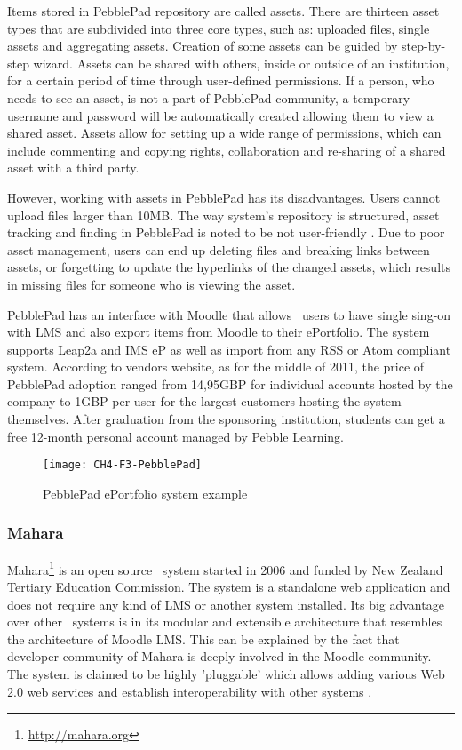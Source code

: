 Items stored in PebblePad repository are called assets. There are thirteen asset
types that are subdivided into three core types, such as: uploaded files, single
assets and aggregating assets. Creation of some assets can be guided by
step-by-step wizard. Assets can be shared with others, inside or outside of an
institution, for a certain period of time through user-defined permissions. If a
person, who needs to see an asset, is not a part of PebblePad community, a
temporary username and password will be automatically created allowing them to
view a shared asset. Assets allow for setting up a wide range of permissions,
which can include commenting and copying rights, collaboration and re-sharing
of a shared asset with a third party.

However, working with assets in PebblePad has its disadvantages. Users cannot
upload files larger than 10MB. The way system's repository is structured, asset
tracking and finding in PebblePad is noted to be not user-friendly
\citep{Overton2009}. Due to poor asset management, users can end up deleting
files and breaking links between assets, or forgetting to update the hyperlinks
of the changed assets, which results in missing files for someone who is viewing
the asset.

PebblePad has an interface with Moodle that allows \ep~users to have
single sing-on with LMS and also export items from Moodle to their ePortfolio.
The system supports Leap2a and IMS eP as well as import from any RSS or Atom
compliant system. According to vendors website, as for the middle of 2011,
the price of PebblePad adoption ranged from 14,95GBP for individual accounts
hosted by the company to 1GBP per user for the largest customers hosting
the system themselves. After graduation from the sponsoring institution,
students can get a free 12-month personal account managed by Pebble Learning.

\begin{figure}[htb]
\centering
\texttt{[image: CH4-F3-PebblePad]}
\caption[PebblePad ePortfolio system example]{PebblePad ePortfolio system example
\citep{PebbleLearningLtd}}
\label{fig:ppep}
\end{figure}
 
\subsubsection{Mahara}
Mahara\footnote{\url{http://mahara.org}} is an open source \ep~system started in
2006 and funded by New Zealand Tertiary Education Commission. The system is a
standalone web application and does not require any kind of LMS or another
system installed. Its big advantage over other \ep~systems is in its modular and
extensible architecture that resembles the architecture of Moodle LMS. This can
be explained by the fact that developer community of Mahara is deeply involved
in the Moodle community. The system is claimed to be highly 'pluggable' which
allows adding various Web 2.0 web services and establish interoperability with
other systems \citep{MaharaGovernanceGroup2011}.

